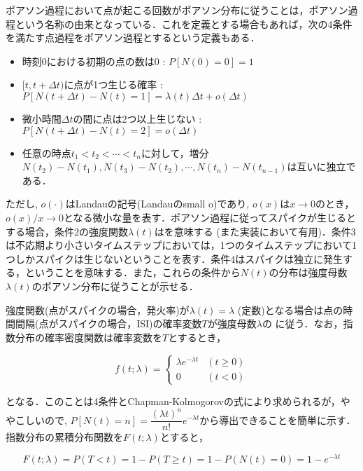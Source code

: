 ポアソン過程において点が起こる回数がポアソン分布に従うことは，ポアソン過程という名称の由来となっている．これを定義とする場合もあれば，次の4条件を満たす点過程をポアソン過程とするという定義もある．

\begin{itemize}
\item 時刻0における初期の点の数は0 : $P[N(0)=0]=1$ 
\item $[t, t+\Delta t)$に点が1つ生じる確率 : $P[N(t+\Delta t)-N(t)=1]=\lambda(t)\Delta t+o(\Delta t)$
\item 微小時間$\Delta t$の間に点は2つ以上生じない : $P[N(t+\Delta t)-N(t)=2]=o(\Delta t)$
\item 任意の時点$t_1 < t_2 < \cdots< t_n$に対して，増分 $N(t_2)-N(t_1), N(t_3)-N(t_2), \cdots, N(t_n)-N(t_{n−1})$は互いに独立である．
\end{itemize}

ただし, $o(\cdot)$はLandauの記号(Landauのsmall o)であり, $o(x)$は$x\to 0$のとき，$o(x)/x\to 0$となる微小な量を表す．ポアソン過程に従ってスパイクが生じるとする場合，条件2の強度関数$\lambda(t)$は\textbf{}を意味する (また実装において有用)．条件3は不応期より小さいタイムステップにおいては，1つのタイムステップにおいて1つしかスパイクは生じないということを表す．条件4はスパイクは独立に発生する，ということを意味する．また，これらの条件から$N(t)$の分布は強度母数$\lambda(t)$のポアソン分布に従うことが示せる．

強度関数(点がスパイクの場合，発火率)が$\lambda(t)=\lambda$ (定数)となる場合は点の時間間隔(点がスパイクの場合，ISI)の確率変数$T$が強度母数$\lambda$の \textbf{}に従う．なお，指数分布の確率密度関数は確率変数を$T$とするとき，


\begin{equation}
f(t;\lambda )=\left\{{\begin{array}{ll}\lambda e^{-\lambda t}&(t\geq 0)\\0&(t<0)\end{array}}\right.
\end{equation}


となる．このことは4条件とChapman-Kolmogorovの式により求められるが，ややこしいので, $P[N(t)=n]=\dfrac{(\lambda t)^{n}}{n !} e^{-\lambda t}$から導出できることを簡単に示す．指数分布の累積分布関数を$F(t; \lambda)$とすると，


\begin{equation}
F(t; \lambda) = P(T< t)=1-P(T\geq t)=1-P(N(t)=0)=1-e^{-\lambda t}
\end{equation}


